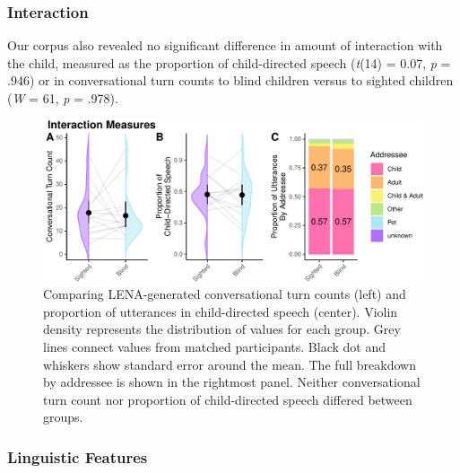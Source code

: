 \documentclass[
  man]{apa6}
\begin{document}
\hypertarget{interaction-1}{%
\subsubsection{Interaction}\label{interaction-1}}

Our corpus also revealed no significant difference in amount of interaction with the child, measured as the proportion of child-directed speech (\emph{t}(14) = 0.07, \emph{p} = .946) or in conversational turn counts to blind children versus to sighted children (\emph{W} = 61, \emph{p} = .978).

\begin{figure}
\centering
\includegraphics{input_quality_manuscript_files/figure-latex/interaction-plots-1.pdf}
\caption{\label{fig:interaction-plots}Comparing LENA-generated conversational turn counts (left) and proportion of utterances in child-directed speech (center). Violin density represents the distribution of values for each group. Grey lines connect values from matched participants. Black dot and whiskers show standard error around the mean. The full breakdown by addressee is shown in the rightmost panel. Neither conversational turn count nor proportion of child-directed speech differed between groups.}
\end{figure}

\hypertarget{linguistic-features-1}{%
\subsubsection{Linguistic Features}\label{linguistic-features-1}}
\end{document}
